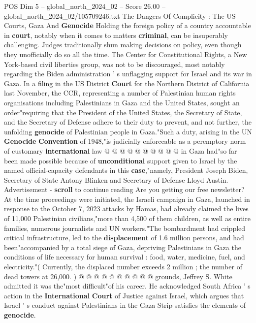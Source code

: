\begin{textsample}{POS Dim 5 – global\_north\_2024\_02 – Score 26.00 – global\_north\_2024\_02/105709246.txt}  \label{ex:f5_pos_231}
The Dangers Of Complicity : The US Courts, Gaza And \textbf{Genocide} Holding the foreign policy of a country accountable in \textbf{court}, notably when it comes to matters \textbf{criminal}, can be insuperably challenging.
Judges traditionally shun making decisions on policy, even though they unofficially do so all the time.
The Center for Constitutional Rights, a New York-based civil liberties group, was not to be discouraged, most notably regarding the Biden administration ' s unflagging support for Israel and its war in Gaza.
In a filing in the US District \textbf{Court} for the Northern District of California last November, the CCR, representing a number of Palestinian human rights organisations including Palestinians in Gaza and the United States, sought an order"requiring that the President of the United States, the Secretary of State, and the Secretary of Defense adhere to their duty to prevent, and not further, the unfolding \textbf{genocide} of Palestinian people in Gaza."Such a duty, arising in the UN \textbf{Genocide} \textbf{Convention} of 1948,"is judicially enforceable as a peremptory norm of customary \textbf{international} law @ @ @ @ @ @ @ @ @ @ in Gaza had"so far been made possible because of \textbf{unconditional} support given to Israel by the named official-capacity defendants in this \textbf{case},"namely, President Joseph Biden, Secretary of State Antony Blinken and Secretary of Defense Lloyd Austin.
Advertisement - \textbf{scroll} to continue reading Are you getting our free newsletter?
At the time proceedings were initiated, the Israeli campaign in Gaza, launched in response to the October 7, 2023 attacks by Hamas, had already claimed the lives of 11,000 Palestinian civilians,"more than 4,500 of them children, as well as entire families, numerous journalists and UN workers."The bombardment had crippled critical infrastructure, led to the \textbf{displacement} of 1.6 million persons, and had been"accompanied by a total siege of Gaza, depriving Palestinians in Gaza the conditions of life necessary for human survival : food, water, medicine, fuel, and electricity."( Currently, the displaced number exceeds 2 million ; the number of dead towers at 26,000. ) @ @ @ @ @ @ @ @ @ @ grounds, Jeffrey S.
White admitted it was the"most difficult"of his career.
He acknowledged South Africa ' s action in the \textbf{International} \textbf{Court} of Justice against Israel, which argues that Israel ' s conduct against Palestinians in the Gaza Strip satisfies the elements of \textbf{genocide}.

\end{textsample}
